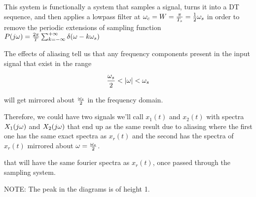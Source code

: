 \documentclass[11pt, fleqn]{article}
\begin{document}
This system is functionally a system that samples a signal, turns it into a DT sequence, and then applies a lowpass filter at $ \omega_c = W = \frac{\pi}{T_s} = \frac{1}{2}\omega_s$ in order to remove the periodic extensions of sampling function $P(j\omega) = \frac{2\pi}{T}\sum_{k=-\infty}^{+\infty}\delta(\omega - k\omega_s) $

\hspace*{1mm}

The effects of aliasing tell us that any frequency components present in the input signal that exist in the range

$$
    \frac{\omega_s}{2} < |\omega| < \omega_s
$$

will get mirrored about $ \frac{\omega_s}{2} $ in the frequency domain.

\hspace*{1mm}

Therefore, we could have two signals we'll call $x_1(t)$ and $x_2(t)$ with spectra $X_1(j\omega)$ and $X_2(j\omega)$ that end up as the same result due to aliasing where the first one has the same exact spectra as $x_r(t)$ and the second has the spectra of $x_r(t)$ mirrored about $\omega = \frac{\omega_s}{2}$.

that will have the same fourier spectra as $ x_r(t) $, once passed through the sampling system.


NOTE: The peak in the diagrams is of height 1.
\end{document}
